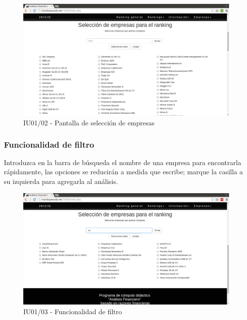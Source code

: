     \begin{figure}[H]
		\begin{center}
			\includegraphics[scale=0.3]{pantallas/Index2}
			\caption{IU01/02 - Pantalla de selección de empresas}
		\end{center}
	\end{figure}


    \subsubsection{Funcionalidad de filtro}

    Introduzca en la barra de búsqueda el nombre de una empresa para encontrarla rápidamente,
    las opciones se reducirán a medida que escribe;
    marque la casilla a su izquierda para agregarla al análisis.

    \begin{figure}[H]
		\begin{center}
			\includegraphics[scale=0.3]{pantallas/Index3}
			\caption{IU01/03 - Funcionalidad de filtro}
		\end{center}
	\end{figure}


